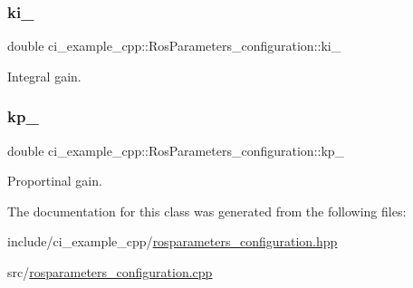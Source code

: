 \subsubsection{\texorpdfstring{ki\+\_\+}{ki\_}}
{\footnotesize\ttfamily double ci\+\_\+example\+\_\+cpp\+::\+Ros\+Parameters\+\_\+configuration\+::ki\+\_\+\hspace{0.3cm}{\ttfamily [private]}}

Integral gain. \mbox{\label{classci__example__cpp_1_1RosParameters__configuration_a4b8d047f6493863c6878df5209331761}} 
\subsubsection{\texorpdfstring{kp\+\_\+}{kp\_}}
{\footnotesize\ttfamily double ci\+\_\+example\+\_\+cpp\+::\+Ros\+Parameters\+\_\+configuration\+::kp\+\_\+\hspace{0.3cm}{\ttfamily [private]}}

Proportinal gain. 

The documentation for this class was generated from the following files\+:\begin{DoxyCompactItemize}
\item 
include/ci\+\_\+example\+\_\+cpp/\hyperlink{rosparameters__configuration_8hpp}{rosparameters\+\_\+configuration.\+hpp}\item 
src/\hyperlink{rosparameters__configuration_8cpp}{rosparameters\+\_\+configuration.\+cpp}\end{DoxyCompactItemize}
